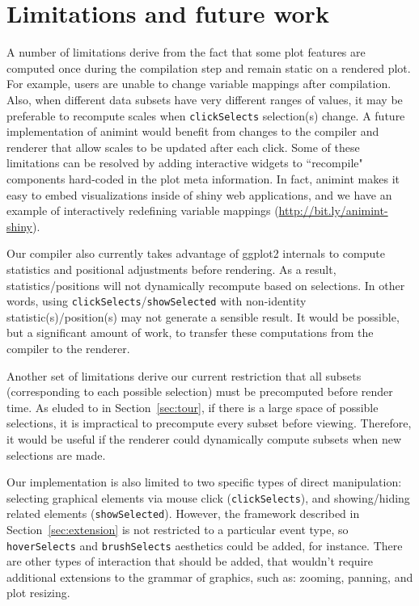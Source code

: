 \documentclass[12pt]{article}\usepackage[]{graphicx}\usepackage[]{color}
\begin{document}
\section{Limitations and future work}
\label{sec:limitations}


A number of limitations derive from the fact that some plot features
are computed once during the compilation step and remain static on a
rendered plot. For example, users are unable to change variable
mappings after compilation.
Also, when different data subsets have very different ranges of
values, it may be preferable to recompute scales when
\texttt{clickSelects} selection(s) change. A future
implementation of animint would benefit from changes to the compiler
and renderer that allow scales to be updated after each click. Some 
of these limitations can be resolved by adding interactive widgets
to ``recompile" components hard-coded in the plot meta information.
In fact, animint makes it easy to embed visualizations inside of
shiny web applications, and we have an example of interactively
redefining variable mappings (\url{http://bit.ly/animint-shiny}).

Our compiler also currently takes advantage of ggplot2 internals to compute 
statistics and positional adjustments before rendering. As a result,
statistics/positions will not dynamically recompute based on selections.
In other words, using \texttt{clickSelects}/\texttt{showSelected} with 
non-identity statistic(s)/position(s) may not generate a sensible result. 
It would be possible, but a significant amount of work, to transfer these 
computations from the compiler to the renderer.

Another set of limitations derive our current restriction that all 
subsets (corresponding to each possible selection) must be precomputed
before render time. As eluded to in Section~\ref{sec:tour},
if there is a large space of possible selections,
it is impractical to precompute every subset before viewing.
Therefore, it would be useful if the renderer could
dynamically compute subsets when new selections are made. 

Our implementation is also limited to two specific types of
direct manipulation: selecting graphical elements via
mouse click (\texttt{clickSelects}), and showing/hiding related 
elements (\texttt{showSelected}). However, the framework described in 
Section~\ref{sec:extension} is not restricted to a particular event type, 
so \texttt{hoverSelects} and \texttt{brushSelects} aesthetics could be 
added, for instance. There are other types of interaction that should be
added, that wouldn't require additional extensions to the grammar of graphics,
such as: zooming, panning, and plot resizing.
\end{document}
